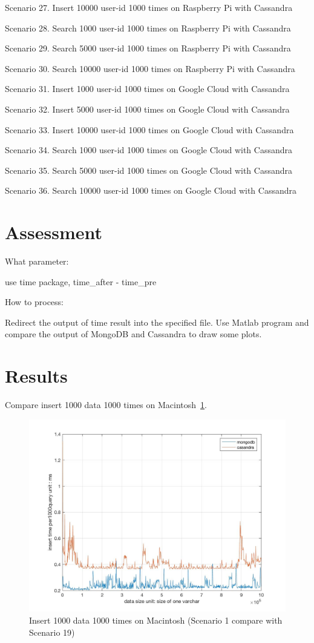 Scenario 27. Insert 10000 user-id 1000 times on Raspberry Pi with Cassandra 

Scenario 28. Search 1000 user-id 1000 times on Raspberry Pi with Cassandra 

Scenario 29. Search 5000 user-id 1000 times on Raspberry Pi with Cassandra 

Scenario 30. Search 10000 user-id 1000 times on Raspberry Pi with Cassandra 


Scenario 31. Insert 1000 user-id 1000 times on Google Cloud with Cassandra 

Scenario 32. Insert 5000 user-id 1000 times on Google Cloud with Cassandra 

Scenario 33. Insert 10000 user-id 1000 times on Google Cloud with Cassandra 

Scenario 34. Search 1000 user-id 1000 times on Google Cloud with Cassandra 

Scenario 35. Search 5000 user-id 1000 times on Google Cloud with Cassandra 

Scenario 36. Search 10000 user-id 1000 times on Google Cloud with Cassandra 

\section{Assessment}
What parameter:

use time package, time\_after - time\_pre 

How to process:

Redirect the output of time result into the specified file. Use Matlab program 
and compare the output of MongoDB and Cassandra to draw some plots. 

\section{Results}
Compare insert 1000 data 1000 times on Macintosh~\ref{f:fly}.

\begin{figure}[!ht]
  \centering\includegraphics[width=\columnwidth]{images/insert_comp_1000.jpg}
  \caption{Insert 1000 data 1000 times on Macintosh 
  (Scenario 1 compare with Scenario 19)}\label{f:fly}
\end{figure}

